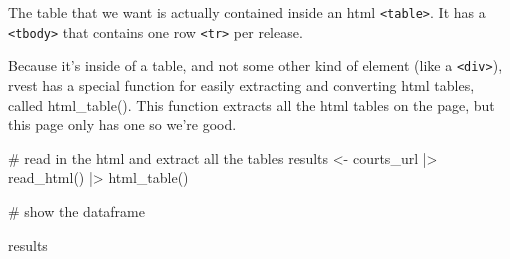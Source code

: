 \documentclass[
  letterpaper,
  DIV=11,
  numbers=noendperiod]{scrreprt}
\newenvironment{Shaded}{\begin{snugshade}}{\end{snugshade}}
\newcommand{\CommentTok}[1]{\textcolor[rgb]{0.37,0.37,0.37}{#1}}
\newcommand{\FunctionTok}[1]{\textcolor[rgb]{0.28,0.35,0.67}{#1}}
\newcommand{\NormalTok}[1]{\textcolor[rgb]{0.00,0.23,0.31}{#1}}
\newcommand{\OtherTok}[1]{\textcolor[rgb]{0.00,0.23,0.31}{#1}}
\newcommand{\SpecialCharTok}[1]{\textcolor[rgb]{0.37,0.37,0.37}{#1}}
\begin{document}
The table that we want is actually contained inside an html
\texttt{\textless{}table\textgreater{}}. It has a
\texttt{\textless{}tbody\textgreater{}} that contains one row
\texttt{\textless{}tr\textgreater{}} per release.

Because it's inside of a table, and not some other kind of element (like
a \texttt{\textless{}div\textgreater{}}), rvest has a special function
for easily extracting and converting html tables, called html\_table().
This function extracts all the html tables on the page, but this page
only has one so we're good.

\begin{Shaded}
\begin{Highlighting}[]
\CommentTok{\# read in the html and extract all the tables}
\NormalTok{results }\OtherTok{\textless{}{-}}\NormalTok{ courts\_url }\SpecialCharTok{|\textgreater{}}
  \FunctionTok{read\_html}\NormalTok{() }\SpecialCharTok{|\textgreater{}}
  \FunctionTok{html\_table}\NormalTok{()}

\CommentTok{\# show the dataframe}

\NormalTok{results}
\end{Highlighting}
\end{Shaded}
\end{document}
